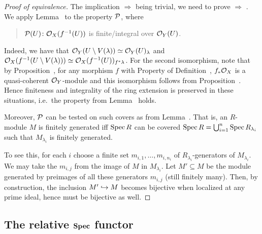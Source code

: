 \documentclass[a4paper,parskip=half,numbers=enddot, DIV=12]{scrreprt}
\begin{document}
\begin{proof}[Proof of equivalence]
	The implication  $\Rightarrow$  being trivial, we need to prove  $\Rightarrow$ . We apply Lemma~ to the property $\mathcal{P}$, where
	\begin{quote}
		$\mathcal{P}(U)\colon\mathcal{O}_X(f^{-1}(U))$ is finite/integral over $\mathcal{O}_Y(U)$.
	\end{quote}
	Indeed, we have that $\mathcal{O}_Y(U\setminus V(\lambda))\simeq \mathcal{O}_Y(U)_\lambda$ and $\mathcal{O}_X(f^{-1}(U\setminus V(\lambda))) \simeq \mathcal{O}_X(f^{-1}(U))_{f^*\lambda}$. For the second isomorphism, note that by Proposition~, for any morphism $f$ with Property  of Definition~, $f_*\mathcal{O}_X$ is a quasi-coherent $\mathcal{O}_Y$-module and this isomorphism follows from Proposition~. Hence finiteness and integrality of the ring extension is preserved in these situations, i.e.\ the property from Lemma~\itememph{\alpha} holds. 
	
	Moreover, $\mathcal{P}$ can be tested on such covers as from Lemma~\itememph{\beta}. That is, an $R$-module $M$ is finitely generated iff $\operatorname{Spec} R$ can be covered $\operatorname{Spec} R = \bigcup_{i=1}^n \operatorname{Spec} R_{\lambda_i}$ such that $M_{\lambda_i}$ is finitely generated. 
	
	To see this, for each $i$ choose a finite set $m_{i,1},\ldots,m_{i,n_i}$ of $R_{\lambda_i}$-generators of $M_{\lambda_i}$. We may take the $m_{i,j}$ from the image of $M$ in $M_{\lambda_i}$. Let $M'\subseteq M$ be the module generated by preimages of all these generators $m_{i,j}$ (still finitely many). Then, by construction, the inclusion $M'\monomorphism M$ becomes bijective when localized at any prime ideal, hence must be bijective as well.
\end{proof}
\subsection{The relative \texorpdfstring{$\operatorname{\mathbf{Spec}}$}{Spec} functor}
\end{document}

